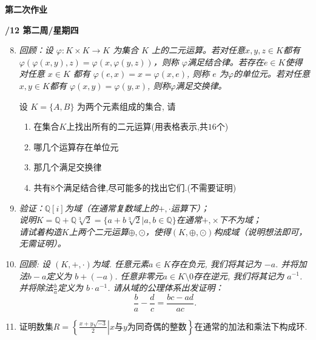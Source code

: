 \documentclass[a4paper,12pt]{article}
\begin{document}
\vspace*{0.3cm} %
\begin{center} %
	{\Large \bf 第二次作业} %
	\vspace{2mm}
	
	{\bf{}/12 \quad  第二周/星期四} %

\end{center}  

\begin{enumerate}\setcounter{enumi}{7}
\item {\it 回顾：设 $\varphi\colon K\times K \rightarrow K$ 为集合 $K$ 上的二元运算。若对任意$x,y,z\in K$都有$\varphi(\varphi(x,y),z)=\varphi(x,\varphi(y,z))$，则称 $\varphi$满足结合律。若存在$e\in K$使得对任意 $x\in K$ 都有 $\varphi(e,x)=x=\varphi(x,e)$, 则称 $e$ 为$\varphi$的单位元。若对任意$x,y\in K$都有 $\varphi(x,y)=\varphi(y,x)$, 则称$\varphi$满足交换律。
 
设 $K=\{A,B\}$ 为两个元素组成的集合, 请
\begin{enumerate}
\item 在集合$K$上找出所有的二元运算(用表格表示,共$16$个)  
\item 哪几个运算存在单位元
\item 那几个满足交换律
\item 共有$8$个满足结合律,尽可能多的找出它们.(不需要证明)
\end{enumerate}}


\item {\it {}验证：$\mathbb{Q}[i]$为域（在通常复数域上的$+,\cdot$运算下）；
 \\ 说明$K=\mathbb{Q}+\mathbb{Q}\sqrt[3]{2}=\{ a+b\sqrt[3]{2}|a,b\in \mathbb{Q}\}$在通常$+,\times$下不为域；
 \\ 请试着构造$K$上两个二元运算$\oplus,\odot$，使得$(K,\oplus,\odot)$构成域（说明想法即可，无需证明）。}
 \item {\it 回顾: 设 $(K,+,\cdot)$为域. 任意元素$a\in K$存在负元, 我们将其记为 $-a$. 并将加法$b-a$定义为 $b+(-a)$. 任意非零元$a\in K\setminus{0}$存在逆元, 我们将其记为 $a^{-1}$. 并将除法$\frac{b}{a}$定义为 $b\cdot a^{-1}$. 请从域的公理体系出发证明：
 \[\frac{b}{a}-\frac{d}{c}=\frac{bc-ad}{ac}.\]}

 \item 证明数集$R=\left\{\left.\frac{x+y\sqrt{-3}}{2}\right| x\text{与}y\text{为同奇偶的整数}\right\}$在通常的加法和乘法下构成环.
 

\end{enumerate}
\end{document}
